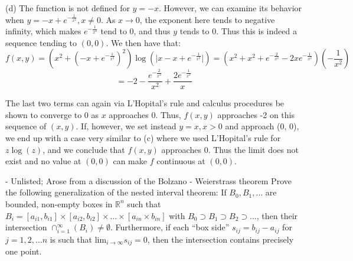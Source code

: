 \begin{solution}
    (d) The function is not defined for $y = -x$. However, we can examine its behavior when $y = -x + e^{-\frac{1}{x^2}}, x \neq 0$. As $x \rightarrow 0$, the exponent here tends to negative infinity, which makes $e^{-\frac{1}{x^2}}$ tend to 0, and thus $y$ tends to 0. Thus this is indeed a sequence tending to $(0, 0)$. We then have that:
    $$f(x, y) = (x^2 + (-x + e^{-\frac{1}{x^2}})^2)\log(\lvert x - x + e^{-\frac{1}{x^2}}\rvert) = (x^2 + x^2 + e^{-\frac{2}{x^2}} - 2xe^{-\frac{1}{x^2}})(-\frac{1}{x^2})$$
    $$ = -2 - \frac{e^{-\frac{2}{x^2}}}{x^2} + \frac{2e^{-\frac{1}{x^2}}}{x}$$

    The last two terms can again via L'Hopital's rule and calculus procedures be shown to converge to 0 as $x$ approaches 0. Thus, $f(x, y)$ approaches -2 on this sequence of $(x, y)$. If, however, we set instead $y = x, x > 0$ and approach (0, 0), we end up with a case very similar to (c) where we used L'Hopital's rule for $z\log(z)$, and we conclude that $f(x, y)$ approaches 0. Thus the limit does not exist and no value at $(0, 0)$ can make $f$ continuous at $(0, 0)$.
\end{solution}

\newpage

\begin{exercise}{ - Unlisted; Arose from a discussion of the Bolzano - Weierstrass theorem}
    Prove the following generalization of the nested interval theorem: If $B_0, B_1, \ldots$ are bounded, non-empty boxes in $\mathbb{R}^n$ such that $B_i = [a_{i1}, b_{i1}] \times [a_{i2}, b_{i2}] \times \ldots \times [a_{in} \times b_{in}]$ with $B_0 \supset B_1 \supset B_2 \supset \ldots$, then their intersection $\cap_{i=1}^{\infty}(B_i) \neq \emptyset$. Furthermore, if each ``box side'' $s_{ij} = b_{ij} - a_{ij}$ for $j=1, 2, \ldots n$ is such that $\text{lim}_{i \rightarrow \infty}s_{ij} = 0$, then the intersection contains precisely one point.
\end{exercise}

